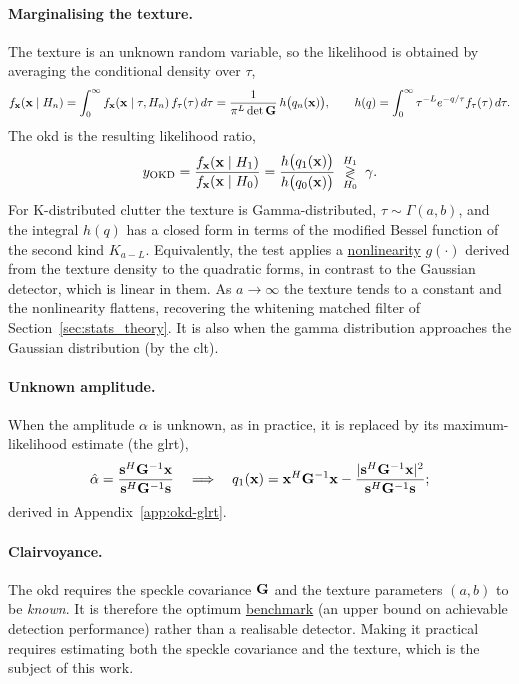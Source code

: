 \documentclass{article}
\begin{document}
\paragraph{Marginalising the texture.}
The texture is an unknown random variable, so the likelihood is obtained by averaging the conditional density over $\tau$,
$$f_{\vb x}(\vb x\mid H_n)=\int_0^\infty f_{\vb x}(\vb x\mid\tau,H_n)\,
   f_\tau(\tau)\,d\tau=\frac{1}{\pi^L\det\mathbf{G}}\,h\big(q_n(\vb x)\big),
   \qquad h(q)=\int_0^\infty \tau^{-L}e^{-q/\tau}f_\tau(\tau)\,d\tau.$$
The \gls{okd} is the resulting likelihood ratio,
$$y_{\text{OKD}}=\frac{f_{\vb x}(\vb x\mid H_1)}{f_{\vb x}(\vb x\mid H_0)}
   =\frac{h\big(q_1(\vb x)\big)}{h\big(q_0(\vb x)\big)}
   \;\underset{H_0}{\overset{H_1}{\gtrless}}\;\gamma.$$
For K-distributed clutter the texture is Gamma-distributed, $\tau\sim\Gamma(a,b)$, and the integral $h(q)$ has a closed form in terms of the modified Bessel function of the second kind $K_{a-L}$. Equivalently, the test applies a \underline{nonlinearity} $g(\cdot)$ derived from the texture density to the quadratic forms, in contrast to the Gaussian detector, which is linear in them. As $a\to\infty$ the texture tends to a constant and the nonlinearity flattens, recovering the whitening matched filter of Section~\ref{sec:stats_theory}. It is also when the gamma distribution approaches the Gaussian distribution (by the \gls{clt}).

\paragraph{Unknown amplitude.}
When the amplitude $\alpha$ is unknown, as in practice, it is replaced by its maximum-likelihood estimate (the \gls{glrt}),
$$\hat\alpha=\frac{\vb s^H\mathbf{G}^{-1}\vb x}{\vb s^H\mathbf{G}^{-1}\vb s}
  \quad\Longrightarrow\quad
  q_1(\vb x)=\vb x^H\mathbf{G}^{-1}\vb x
     -\frac{|\vb s^H\mathbf{G}^{-1}\vb x|^2}{\vb s^H\mathbf{G}^{-1}\vb s};$$
derived in Appendix~\ref{app:okd-glrt}.

\paragraph{Clairvoyance.}
The \gls{okd} requires the speckle covariance $\mathbf{G}$ and the texture parameters $(a,b)$ to be \emph{known}. It is therefore the optimum \underline{benchmark} (an upper bound on achievable detection performance) rather than a realisable detector. Making it practical requires estimating both the speckle covariance and the texture, which is the subject of this work.
\end{document}
